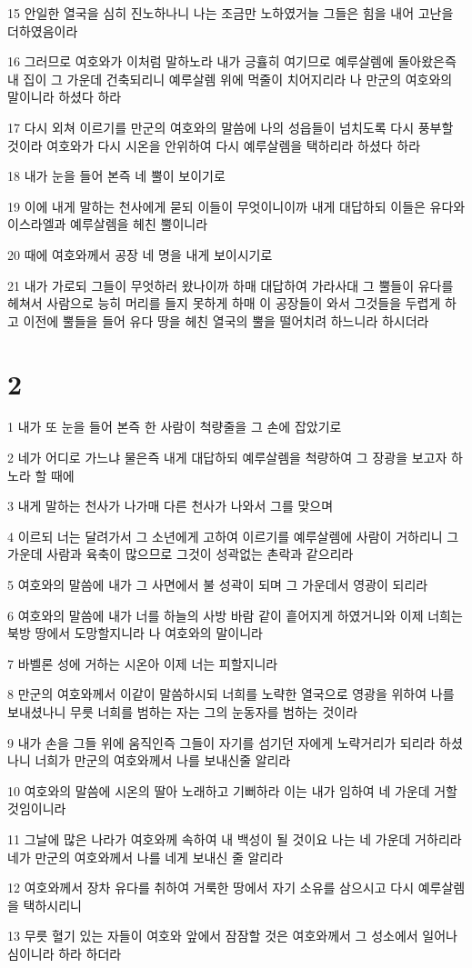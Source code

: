 \par 15 안일한 열국을 심히 진노하나니 나는 조금만 노하였거늘 그들은 힘을 내어 고난을 더하였음이라
\par 16 그러므로 여호와가 이처럼 말하노라 내가 긍휼히 여기므로 예루살렘에 돌아왔은즉 내 집이 그 가운데 건축되리니 예루살렘 위에 먹줄이 치어지리라 나 만군의 여호와의 말이니라 하셨다 하라
\par 17 다시 외쳐 이르기를 만군의 여호와의 말씀에 나의 성읍들이 넘치도록 다시 풍부할 것이라 여호와가 다시 시온을 안위하여 다시 예루살렘을 택하리라 하셨다 하라
\par 18 내가 눈을 들어 본즉 네 뿔이 보이기로
\par 19 이에 내게 말하는 천사에게 묻되 이들이 무엇이니이까 내게 대답하되 이들은 유다와 이스라엘과 예루살렘을 헤친 뿔이니라
\par 20 때에 여호와께서 공장 네 명을 내게 보이시기로
\par 21 내가 가로되 그들이 무엇하러 왔나이까 하매 대답하여 가라사대 그 뿔들이 유다를 헤쳐서 사람으로 능히 머리를 들지 못하게 하매 이 공장들이 와서 그것들을 두렵게 하고 이전에 뿔들을 들어 유다 땅을 헤친 열국의 뿔을 떨어치려 하느니라 하시더라

\chapter{2}

\par 1 내가 또 눈을 들어 본즉 한 사람이 척량줄을 그 손에 잡았기로
\par 2 네가 어디로 가느냐 물은즉 내게 대답하되 예루살렘을 척량하여 그 장광을 보고자 하노라 할 때에
\par 3 내게 말하는 천사가 나가매 다른 천사가 나와서 그를 맞으며
\par 4 이르되 너는 달려가서 그 소년에게 고하여 이르기를 예루살렘에 사람이 거하리니 그 가운데 사람과 육축이 많으므로 그것이 성곽없는 촌락과 같으리라
\par 5 여호와의 말씀에 내가 그 사면에서 불 성곽이 되며 그 가운데서 영광이 되리라
\par 6 여호와의 말씀에 내가 너를 하늘의 사방 바람 같이 흩어지게 하였거니와 이제 너희는 북방 땅에서 도망할지니라 나 여호와의 말이니라
\par 7 바벨론 성에 거하는 시온아 이제 너는 피할지니라
\par 8 만군의 여호와께서 이같이 말씀하시되 너희를 노략한 열국으로 영광을 위하여 나를 보내셨나니 무릇 너희를 범하는 자는 그의 눈동자를 범하는 것이라
\par 9 내가 손을 그들 위에 움직인즉 그들이 자기를 섬기던 자에게 노략거리가 되리라 하셨나니 너희가 만군의 여호와께서 나를 보내신줄 알리라
\par 10 여호와의 말씀에 시온의 딸아 노래하고 기뻐하라 이는 내가 임하여 네 가운데 거할 것임이니라
\par 11 그날에 많은 나라가 여호와께 속하여 내 백성이 될 것이요 나는 네 가운데 거하리라 네가 만군의 여호와께서 나를 네게 보내신 줄 알리라
\par 12 여호와께서 장차 유다를 취하여 거룩한 땅에서 자기 소유를 삼으시고 다시 예루살렘을 택하시리니
\par 13 무릇 혈기 있는 자들이 여호와 앞에서 잠잠할 것은 여호와께서 그 성소에서 일어나심이니라 하라 하더라

